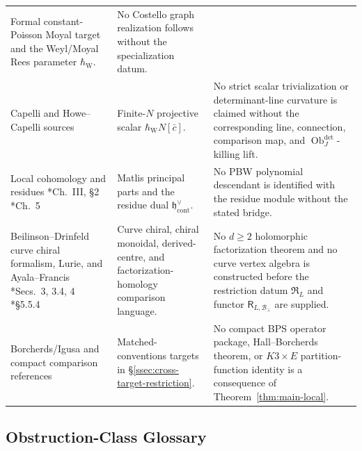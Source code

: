 \begin{center}
\begin{tabular}{@{}>{\raggedright\arraybackslash}p{}
  >{\raggedright\arraybackslash}p{}
  >{\raggedright\arraybackslash}p{}@{}}
Formal constant-Poisson Moyal target and the Weyl/Moyal Rees
parameter \(\hbar_{\mathrm{W}}\). &
No Costello graph realization follows without the specialization datum. \\
Capelli and Howe--Capelli sources \cite{capelli}\cite{howe-capelli} &
Finite-\(N\) projective scalar \(\hbar_{\mathrm{W}}N[\bar c]\). &
No strict scalar trivialization or determinant-line curvature is claimed
without the corresponding line, connection, comparison map, and
\(\operatorname{Ob}^{\det}_J\)-killing lift. \\
Local cohomology and residues
\cite{hartshorne-local-cohomology}*{Ch.~III, \S2}
\cite{kunz-residues-duality}*{Ch.~5} &
Matlis principal parts and the residue dual
\(\mathfrak h^\vee_{\mathrm{cont}}\). &
No PBW polynomial descendant is identified with the residue module
without the stated bridge. \\
Beilinson--Drinfeld curve chiral formalism, Lurie, and Ayala--Francis
\cite{beilinson-drinfeld-chiral}*{Secs.~3, 3.4, 4}
\cite{lurie-ha}*{\S 5.5.4}\cite{ayala-francis} &
Curve chiral, chiral monoidal, derived-centre, and
factorization-homology comparison language. &
No \(d\geq2\) holomorphic factorization theorem and no curve vertex
algebra is constructed before the restriction datum \(\mathfrak R_L\)
and functor \(\mathsf R_{L,\mathcal B_\perp}\) are supplied. \\
Borcherds/Igusa and compact comparison references &
Matched-conventions targets in
\S\ref{ssec:cross-target-restriction}. &
No compact BPS operator package, Hall--Borcherds theorem, or
\(K3\times E\) partition-function identity is a consequence of
Theorem~\ref{thm:main-local}. \\
\end{tabular}
\end{center}

\subsection{Obstruction-Class Glossary}

